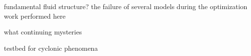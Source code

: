 
fundamental fluid structure? the failure of several models during the
optimization work performed here 

what continuing mysteries



testbed for cyclonic phenomena



